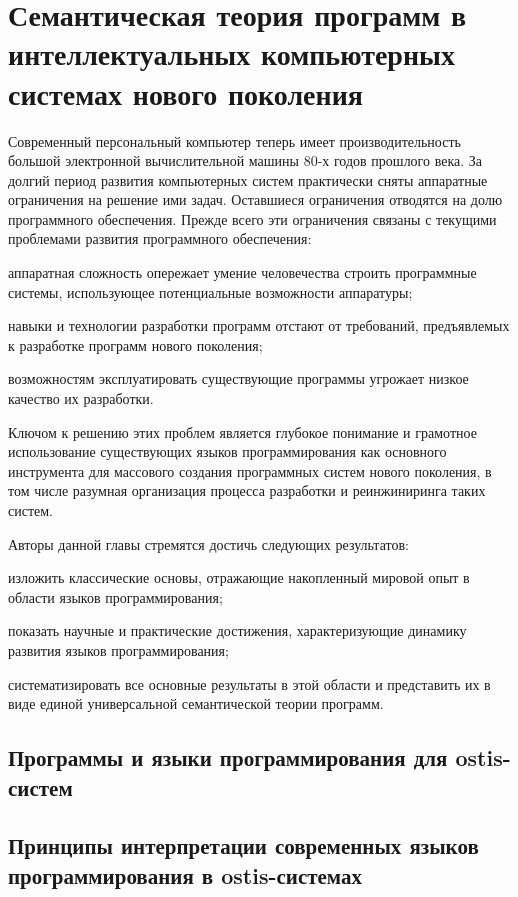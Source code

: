 \chapter{Семантическая теория программ в интеллектуальных компьютерных системах нового поколения}
\label{chapter_programs}

\abstract{}

Современный персональный компьютер теперь имеет производительность большой электронной вычислительной машины 80-х годов
прошлого века. За долгий период развития компьютерных систем практически сняты аппаратные ограничения на решение ими
задач. Оставшиеся ограничения отводятся на долю программного обеспечения.
Прежде всего эти ограничения связаны с текущими проблемами развития программного обеспечения:
\begin{scnitemize}
    \item аппаратная сложность опережает умение человечества строить программные системы, использующее потенциальные
    возможности аппаратуры;
    \item навыки и технологии разработки программ отстают от требований, предъявлемых к разработке программ нового
    поколения;
    \item возможностям эксплуатировать существующие программы угрожает низкое качество их разработки.
\end{scnitemize}
Ключом к решению этих проблем является глубокое понимание и грамотное использование существующих языков программирования 
как основного инструмента для массового создания программных систем нового поколения, в том числе разумная организация 
процесса разработки и реинжиниринга таких систем.

Авторы данной главы стремятся достичь следующих результатов:
\begin{scnitemize}
    \item изложить классические основы, отражающие накопленный мировой опыт в области языков программирования;
    \item показать научные и практические достижения, характеризующие динамику развития языков программирования;
    \item систематизировать все основные результаты в этой области и представить их в виде единой универсальной
    семантической теории программ.
\end{scnitemize}

\section{Программы и языки программирования для ostis-систем}
\section{Принципы интерпретации современных языков программирования в ostis-системах}

%
